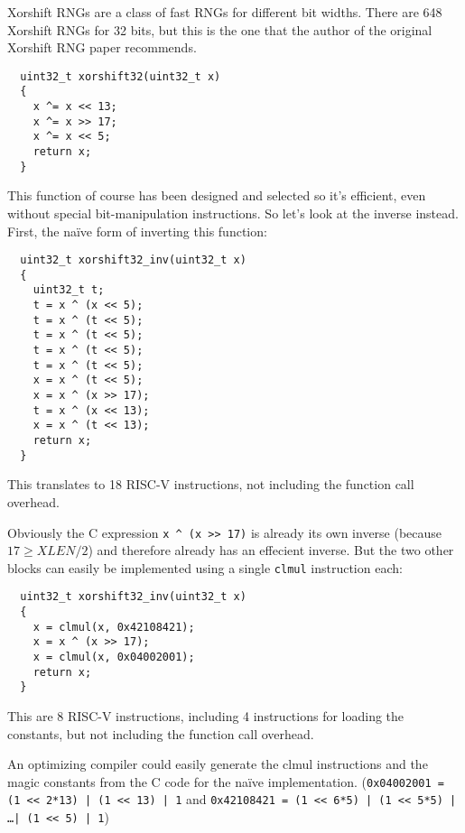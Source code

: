 Xorshift RNGs are a class of fast RNGs for different bit widths. There are 648
Xorshift RNGs for 32 bits, but this is the one that the author of the original
Xorshift RNG paper recommends.~\cite[p. 4]{Xorshift}

\begin{minipage}{\linewidth}
\begin{verbatim}
  uint32_t xorshift32(uint32_t x)
  {
    x ^= x << 13;
    x ^= x >> 17;
    x ^= x << 5;
    return x;
  }
\end{verbatim}
\end{minipage}

This function of course has been designed and selected so it's efficient, even
without special bit-manipulation instructions. So let's look at the inverse
instead. First, the na\"ive form of inverting this function:

\begin{minipage}{\linewidth}
\begin{verbatim}
  uint32_t xorshift32_inv(uint32_t x)
  {
    uint32_t t;
    t = x ^ (x << 5);
    t = x ^ (t << 5);
    t = x ^ (t << 5);
    t = x ^ (t << 5);
    t = x ^ (t << 5);
    x = x ^ (t << 5);
    x = x ^ (x >> 17);
    t = x ^ (x << 13);
    x = x ^ (t << 13);
    return x;
  }
\end{verbatim}
\end{minipage}

This translates to 18 RISC-V instructions, not including the function call overhead.

Obviously the C expression {\tt x \^{} (x >> 17)} is already its own inverse
(because $17 \ge XLEN/2$) and therefore already has an effecient inverse. But the two
other blocks can easily be implemented using a single {\tt clmul} instruction each:

\begin{minipage}{\linewidth}
\begin{verbatim}
  uint32_t xorshift32_inv(uint32_t x)
  {
    x = clmul(x, 0x42108421);
    x = x ^ (x >> 17);
    x = clmul(x, 0x04002001);
    return x;
  }
\end{verbatim}
\end{minipage}

This are 8 RISC-V instructions, including 4 instructions for loading the
constants, but not including the function call overhead.

An optimizing compiler could easily generate the clmul instructions and the magic
constants from the C code for the na\"ive implementation. ({\tt 0x04002001 = (1 << 2*13) | (1 << 13) | 1}
and {\tt 0x42108421 = (1 << 6*5) | (1 << 5*5) | \dots | (1 << 5) | 1})

